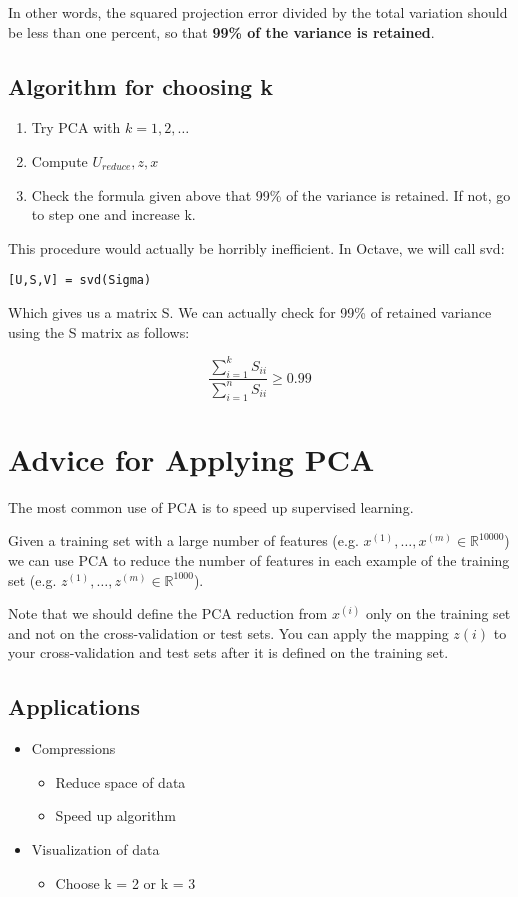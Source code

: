 In other words, the squared projection error divided by the total variation should be less than one percent, so that \textbf{99\% of the variance is retained}.
\subsection{Algorithm for choosing k}
\begin{enumerate}
	\item Try PCA with $k=1,2,\dots$
	\item Compute $U_{reduce}, z, x$
	\item Check the formula given above that 99\% of the variance is retained. If not, go to step one and increase k.
\end{enumerate}
This procedure would actually be horribly inefficient. In Octave, we will call svd:

\verb|[U,S,V] = svd(Sigma)|

Which gives us a matrix S. We can actually check for 99\% of retained variance using the S matrix as follows:

$$\dfrac{\sum_{i=1}^kS_{ii}}{\sum_{i=1}^nS_{ii}} \geq 0.99 $$
\section{Advice for Applying PCA}
The most common use of PCA is to speed up supervised learning.

Given a training set with a large number of features (e.g. $x^{(1)},\dots,x^{(m)} \in \mathbb{R}^{10000}$) we can use PCA to reduce the number of features in each example of the training set (e.g. $z^{(1)},\dots,z^{(m)} \in \mathbb{R}^{1000}$).

Note that we should define the PCA reduction from $x^{(i)}$ only on the training set and not on the cross-validation or test sets. You can apply the mapping $z(i)$ to your cross-validation and test sets after it is defined on the training set.

\subsection{Applications}
\begin{itemize}
	\item Compressions
	\begin{itemize}
		\item Reduce space of data
		\item Speed up algorithm
	\end{itemize}
	\item Visualization of data
	\begin{itemize}
		\item Choose k = 2 or k = 3
	\end{itemize}
\end{itemize}

